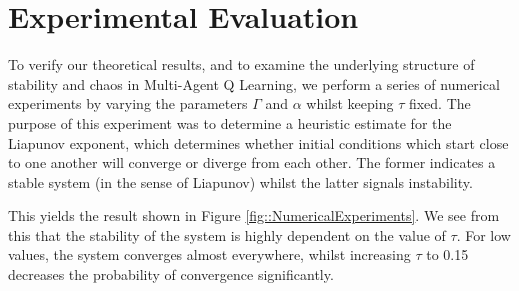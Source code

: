 \documentclass[letterpaper]{article} %
\begin{document}
\section{Experimental Evaluation}

To verify our theoretical results, and to examine the underlying structure of stability and chaos in
Multi-Agent Q Learning, we perform a series of numerical experiments by varying the parameters $\Gamma$ and
$\alpha$ whilst keeping $\tau$ fixed. The purpose of this experiment was to determine a heuristic estimate for the Liapunov exponent, which determines whether initial conditions which start close to one another will converge or diverge from each other. The former indicates a stable system (in the sense of Liapunov) whilst the latter signals instability.

This yields the result shown in
Figure \ref{fig::NumericalExperiments}. We see from this that the stability of the system is highly dependent on
the value of $\tau$.
For
low values, the system converges almost everywhere, whilst increasing $\tau$ to 0.15 decreases
the probability of convergence significantly.
\end{document}
